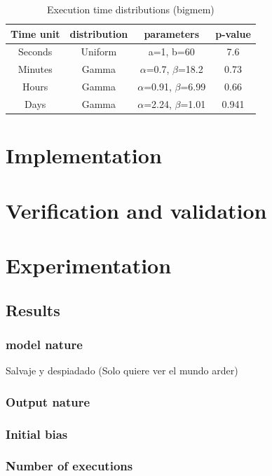 \documentclass{wscpaperproc}
\begin{document}
\begin{table}[h!]
    \centering
    \begin{tabular}{ | c | c | c | c |}
        \hline
        \textbf{Time unit} & \textbf{distribution} & \textbf{parameters} & \textbf{p-value} \\
        \hline
        Seconds & Uniform & a=1, b=60 & 7.6 \\
        \hline
        Minutes & Gamma & $\alpha$=0.7, $\beta$=18.2 & 0.73 \\
        \hline
        Hours & Gamma & $\alpha$=0.91, $\beta$=6.99 & 0.66 \\
        \hline
        Days & Gamma & $\alpha$=2.24, $\beta$=1.01 & 0.941 \\
        \hline
    \end{tabular}
    \caption{Execution time distributions (bigmem)}
    \label{distributions_bigmem}
\end{table}

\section{Implementation}

\section{Verification and validation}

\section{Experimentation}

\subsection{Results}

\subsubsection{model nature} Salvaje y despiadado (Solo quiere ver el mundo arder)
\subsubsection{Output nature}
\subsubsection{Initial bias}
\subsubsection{Number of executions}
\end{document}

